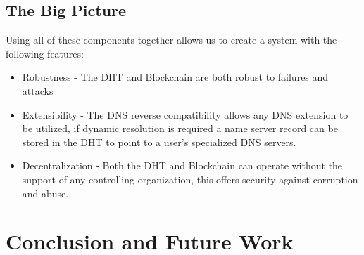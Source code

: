 \documentclass[11pt]{IEEEtran} %
\begin{document}
\subsection{The Big Picture}
Using all of these components together allows us to create a system with the following features:
\begin{itemize}
	\item Robustness - The DHT and Blockchain are both robust to failures and attacks
	\item Extensibility - The DNS reverse compatibility allows any DNS extension to be utilized, if dynamic resolution is required a name server record can be stored in the DHT to point to a user's specialized DNS servers.
	\item Decentralization - Both the DHT and Blockchain can operate without the support of any controlling organization, this offers security against corruption and abuse.
\end{itemize}	


\section{Conclusion and Future Work}


\end{document}
